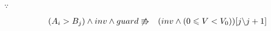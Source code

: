 \documentclass{article}
\newcommand{\VARIANTEXP}{(0 \leqslant V < V_0)}
\begin{document}
$\because$

\begin{eqnarray*}
(A_i > B_j) \land inv \land guard & \not\entails & (inv \land \VARIANTEXP)[j \backslash j + 1]\\
\end{eqnarray*}











  

\end{document}
